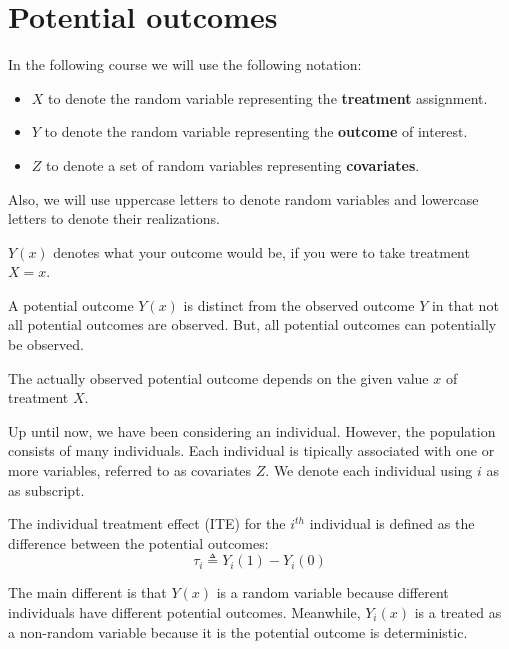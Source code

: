 \chapter{Potential outcomes}
In the following course we will use the following notation:
\begin{itemize}
    \item $X$ to denote the random variable representing the \textbf{treatment}
          assignment.
    \item $Y$ to denote the random variable representing the \textbf{outcome} of
          interest.
    \item $Z$ to denote a set of random variables representing \textbf{covariates}.
\end{itemize}

Also, we will use uppercase letters to denote random variables and lowercase
letters to denote their realizations.

\begin{definition}
    $Y(x)$ denotes what your outcome would be, if you were to take treatment $X = x$.
\end{definition}
A potential outcome $Y(x)$ is distinct from the observed outcome $Y$ in that not
all potential outcomes are observed. But, all potential outcomes can potentially
be observed.

The actually observed potential outcome depends on the given value $x$ of treatment $X$.

Up until now, we have been considering an individual. However, the population
consists of many individuals. Each individual is tipically associated with one or
more variables, referred to as covariates $Z$. We denote each individual using $i$
as as subscript.

\begin{definition}
    The individual treatment effect (ITE) for the $i^{th}$ individual
    is defined as the difference between the potential outcomes:
    \begin{equation}
        \tau_i \triangleq Y_i(1) - Y_i(0)
    \end{equation}

    The main different is that $Y(x)$ is a random variable because different individuals
    have different potential outcomes. Meanwhile, $Y_i(x)$ is a treated as a
    non-random variable because it is the potential outcome is deterministic.
\end{definition}

